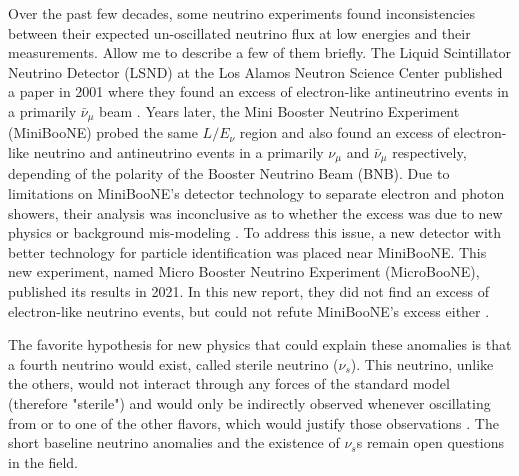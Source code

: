 Over the past few decades, some neutrino experiments found inconsistencies between their expected un-oscillated neutrino flux at low energies and their measurements. Allow me to describe a few of them briefly. The Liquid Scintillator Neutrino Detector (LSND) at the Los Alamos Neutron Science Center published a paper in 2001 where they found an excess of electron-like antineutrino events in a primarily $\bar{\nu}_{\mu}$ beam \cite{lsnd}. Years later, the Mini Booster Neutrino Experiment (MiniBooNE) probed the same $L/E_{\nu}$ region and also found an excess of electron-like neutrino and antineutrino events in a primarily $\nu_{\mu}$ and $\bar{\nu}_{\mu}$ respectively, depending of the polarity of the Booster Neutrino Beam (BNB). Due to limitations on MiniBooNE's detector technology to separate electron and photon showers, their analysis was inconclusive as to whether the excess was due to new physics or background mis-modeling \cite{miniboone}. To address this issue, a new detector with better technology for particle identification was placed near MiniBooNE. This new experiment, named Micro Booster Neutrino Experiment (MicroBooNE), published its results in 2021. In this new report, they did not find an excess of electron-like neutrino events, but could not refute MiniBooNE's excess either \cite{microboone_lee}. 

The favorite hypothesis for new physics that could explain these anomalies is that a fourth neutrino would exist, called sterile neutrino ($\nu_s$). This neutrino, unlike the others, would not interact through any forces of the standard model (therefore "sterile") and would only be indirectly observed whenever oscillating from or to one of the other flavors, which would justify those observations \cite{Lauren_thesis}. 
The short baseline neutrino anomalies and the existence of $\nu_s$s remain open questions in the field. 